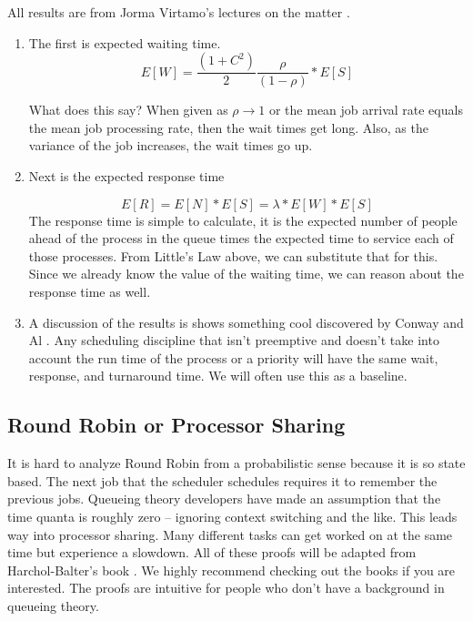 All results are from Jorma Virtamo's lectures on the matter \cite{virtamo}.

\begin{enumerate}
\item The first is expected waiting time.
  \[
  E[W] = \frac{(1 + C^2)}{2}\frac{\rho}{(1 - \rho)} * E[S]
  \]

  What does this say? When given as $\rho \rightarrow 1$ or the mean job arrival rate equals the mean job processing rate, then the wait times get long.
  Also, as the variance of the job increases, the wait times go up.

\item Next is the expected response time

  \[
  E[R] = E[N] * E[S] = \lambda * E[W] * E[S]
  \]
  The response time is simple to calculate, it is the expected number of people ahead of the process in the queue times the expected time to service each of those processes.
  From Little's Law above, we can substitute that for this. Since we already know the value of the waiting time, we can reason about the response time as well.
\item A discussion of the results is shows something cool discovered by Conway and Al \cite{conway1967theory}.
  Any scheduling discipline that isn't preemptive and doesn't take into account the run time of the process or a priority will have the same wait, response, and turnaround time.
  We will often use this as a baseline.
\end{enumerate}

\subsection{Round Robin or Processor Sharing}

It is hard to analyze Round Robin from a probabilistic sense because it is so state based.
The next job that the scheduler schedules requires it to remember the previous jobs.
Queueing theory developers have made an assumption that the time quanta is roughly zero -- ignoring context switching and the like.
This leads way into processor sharing.
Many different tasks can get worked on at the same time but experience a slowdown.
All of these proofs will be adapted from Harchol-Balter's book \cite{harchol2013performance}.
We highly recommend checking out the books if you are interested.
The proofs are intuitive for people who don't have a background in queueing theory.

